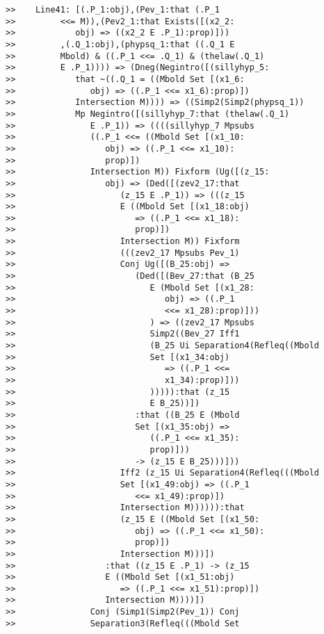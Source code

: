 \documentclass[12pt]{article}
\begin{document}
\begin{verbatim}
>>    Line41: [(.P_1:obj),(Pev_1:that (.P_1
>>         <<= M)),(Pev2_1:that Exists([(x2_2:
>>            obj) => ((x2_2 E .P_1):prop)]))
>>         ,(.Q_1:obj),(phypsq_1:that ((.Q_1 E
>>         Mbold) & ((.P_1 <<= .Q_1) & (thelaw(.Q_1)
>>         E .P_1)))) => (Dneg(Negintro([(sillyhyp_5:
>>            that ~((.Q_1 = ((Mbold Set [(x1_6:
>>               obj) => ((.P_1 <<= x1_6):prop)])
>>            Intersection M)))) => ((Simp2(Simp2(phypsq_1))
>>            Mp Negintro([(sillyhyp_7:that (thelaw(.Q_1)
>>               E .P_1)) => ((((sillyhyp_7 Mpsubs
>>               ((.P_1 <<= ((Mbold Set [(x1_10:
>>                  obj) => ((.P_1 <<= x1_10):
>>                  prop)])
>>               Intersection M)) Fixform (Ug([(z_15:
>>                  obj) => (Ded([(zev2_17:that
>>                     (z_15 E .P_1)) => (((z_15
>>                     E ((Mbold Set [(x1_18:obj)
>>                        => ((.P_1 <<= x1_18):
>>                        prop)])
>>                     Intersection M)) Fixform
>>                     (((zev2_17 Mpsubs Pev_1)
>>                     Conj Ug([(B_25:obj) =>
>>                        (Ded([(Bev_27:that (B_25
>>                           E (Mbold Set [(x1_28:
>>                              obj) => ((.P_1
>>                              <<= x1_28):prop)]))
>>                           ) => ((zev2_17 Mpsubs
>>                           Simp2((Bev_27 Iff1
>>                           (B_25 Ui Separation4(Refleq((Mbold
>>                           Set [(x1_34:obj)
>>                              => ((.P_1 <<=
>>                              x1_34):prop)]))
>>                           ))))):that (z_15
>>                           E B_25))])
>>                        :that ((B_25 E (Mbold
>>                        Set [(x1_35:obj) =>
>>                           ((.P_1 <<= x1_35):
>>                           prop)]))
>>                        -> (z_15 E B_25)))]))
>>                     Iff2 (z_15 Ui Separation4(Refleq(((Mbold
>>                     Set [(x1_49:obj) => ((.P_1
>>                        <<= x1_49):prop)])
>>                     Intersection M)))))):that
>>                     (z_15 E ((Mbold Set [(x1_50:
>>                        obj) => ((.P_1 <<= x1_50):
>>                        prop)])
>>                     Intersection M)))])
>>                  :that ((z_15 E .P_1) -> (z_15
>>                  E ((Mbold Set [(x1_51:obj)
>>                     => ((.P_1 <<= x1_51):prop)])
>>                  Intersection M))))])
>>               Conj (Simp1(Simp2(Pev_1)) Conj
>>               Separation3(Refleq(((Mbold Set

\end{verbatim}
\end{document}
